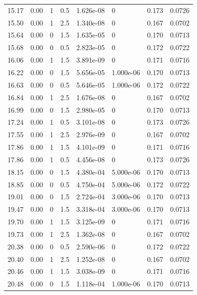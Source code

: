 \documentclass[preview]{standalone}
\begin{document}
{{{\begin{tabular}{L{1.2cm}C{1.2cm} C{0.3cm}C{0.5cm} C{1.4cm}C{1.4cm} C{1.4cm}C{1.4cm}}
  15.17  &  0.00  & 1     & 0.5 &  1.626e-08  & 0  & 0.173 &  0.0726   \\ 
  15.50  &  0.00  & 1     & 2.5 &  1.340e-08  & 0  & 0.167 &  0.0702   \\ 
  15.64  &  0.00  & 0     & 1.5 &  1.635e-05  & 0  & 0.170 &  0.0713   \\ 
  15.68  &  0.00  & 0     & 0.5 &  2.823e-05  & 0  & 0.172 &  0.0722   \\ 
  16.06  &  0.00  & 1     & 1.5 &  3.891e-09  & 0  & 0.171 &  0.0716   \\ 
  16.22  &  0.00  & 0     & 1.5 &  5.656e-05  & 1.000e-06  & 0.170 &  0.0713   \\ 
  16.63  &  0.00  & 0     & 0.5 &  5.646e-05  & 1.000e-06  & 0.172 &  0.0722   \\ 
  16.84  &  0.00  & 1     & 2.5 &  1.676e-08  & 0  & 0.167 &  0.0702   \\ 
  16.99  &  0.00  & 0     & 1.5 &  2.980e-05  & 0  & 0.170 &  0.0713   \\ 
  17.24  &  0.00  & 1     & 0.5 &  3.101e-08  & 0  & 0.173 &  0.0726   \\ 
  17.55  &  0.00  & 1     & 2.5 &  2.976e-09  & 0  & 0.167 &  0.0702   \\ 
  17.86  &  0.00  & 1     & 1.5 &  4.101e-09  & 0  & 0.171 &  0.0716   \\ 
  17.86  &  0.00  & 1     & 0.5 &  4.456e-08  & 0  & 0.173 &  0.0726   \\ 
  18.15  &  0.00  & 0     & 1.5 &  4.380e-04  & 5.000e-06  & 0.170 &  0.0713   \\ 
  18.85  &  0.00  & 0     & 0.5 &  4.750e-04  & 5.000e-06  & 0.172 &  0.0722   \\ 
  19.01  &  0.00  & 0     & 1.5 &  2.724e-04  & 3.000e-06  & 0.170 &  0.0713   \\ 
  19.47  &  0.00  & 0     & 1.5 &  3.318e-04  & 3.000e-06  & 0.170 &  0.0713   \\ 
  19.70  &  0.00  & 1     & 1.5 &  3.125e-09  & 0  & 0.171 &  0.0716   \\ 
  19.73  &  0.00  & 1     & 2.5 &  1.362e-08  & 0  & 0.167 &  0.0702   \\ 
  20.38  &  0.00  & 0     & 0.5 &  2.590e-06  & 0  & 0.172 &  0.0722   \\ 
  20.40  &  0.00  & 1     & 2.5 &  1.252e-08  & 0  & 0.167 &  0.0702   \\ 
  20.46  &  0.00  & 1     & 1.5 &  3.038e-09  & 0  & 0.171 &  0.0716   \\ 
  20.48  &  0.00  & 0     & 1.5 &  1.118e-04  & 1.000e-06  & 0.170 &  0.0713   \\ 

\end{tabular}}}}
\end{document}
